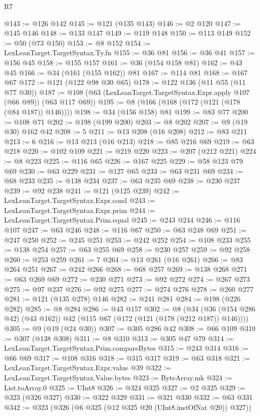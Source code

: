 \begin{lexlean}{R7}
\begin{coremodule}
@143 := @126 @142
@145 := @121 (@135 @143)
@146 := @2 @120
@147 := @145 @146
@148 := @133 @147
@149 := @119 @148
@150 := @113 @149
@152 := @50 (@73 @150)
@153 := @8 @152
@154 := LexLeanTarget.TargetSyntax.Ty.fn
@155 := @36 @81
@156 := @36 @41
@157 := @156 @45
@158 := @155 @157
@161 := @36 (@154 @158 @81)
@162 := @43 @45
@166 := @34 (@161 (@155 @162)) @81
@167 := @114 @81
@168 := @167 @67
@172 := @121 (@122 @98 @30 @65)
@178 := @122 @136 (@11 @55 (@11 @77 @30))
@187 := @108 (@63 (LexLeanTarget.TargetSyntax.Expr.apply @107 (@66 @89)) (@63 @117 @69))
@195 := @8 (@166 (@168 (@172 (@121 (@178 (@84 @187)) @146))))
@198 := @34 (@156 @158) @81
@199 := @83 @77
@200 := @108 @71
@202 := @198 (@199 @200)
@203 := @8 @202
@207 := @9 (@19 @30) @162 @42
@208 := 5
@211 := @13 @208 (@16 @208)
@212 := @83 @211
@213 := 6
@216 := @13 @213 (@16 @213)
@218 := @85 @216 @69
@219 := @63 @218
@220 := @102 @109
@221 := @219 @220
@223 := @207 (@212 @221)
@224 := @8 @223
@225 := @116 @65
@226 := @167 @225
@229 := @58 @123 @79 @69
@230 := @63 @229
@231 := @127 @65
@233 := @63 @231 @69
@234 := @68 @233
@235 := @138 @234
@237 := @63 @235 @69
@238 := @230 @237
@239 := @92 @238
@241 := @121 (@125 @239)
@242 := LexLeanTarget.TargetSyntax.Expr.cond
@243 := LexLeanTarget.TargetSyntax.Expr.prim
@244 := LexLeanTarget.TargetSyntax.Prim.equal
@245 := @243 @244
@246 := @116 @107
@247 := @63 @246
@248 := @116 @67
@250 := @63 @248 @69
@251 := @247 @250
@252 := @245 @251
@253 := @242 @252
@254 := @108 @233
@255 := @138 @254
@257 := @63 @255 @69
@258 := @230 @257
@259 := @92 @258
@260 := @253 @259
@261 := 7
@264 := @13 @261 (@16 @261)
@266 := @83 @264 @251
@267 := @242 @266
@268 := @68 @257
@269 := @138 @268
@271 := @63 @269 @69
@272 := @230 @271
@273 := @92 @272
@274 := @267 @273
@275 := @97 @237
@276 := @92 @275
@277 := @274 @276
@278 := @260 @277
@281 := @121 (@135 @278) @146
@282 := @241 @281
@284 := @198 (@226 @282)
@285 := @8 @284
@286 := @43 @157
@302 := @8
    (@34 (@36 (@154 @286 @42) (@43 @162)) @42 (@115 @67 (@172 (@121 (@178 (@212 @187)) @146))))
@305 := @9 (@19 (@24 @30))
@307 := @305 @286 @42
@308 := @66 @109
@310 := @307 (@138 @308)
@311 := @8 @310
@313 := @305 @47 @79
@314 := LexLeanTarget.TargetSyntax.Prim.compareBytes
@315 := @243 @314
@316 := @66 @69
@317 := @108 @316
@318 := @315 @317
@319 := @63 @318
@321 := LexLeanTarget.TargetSyntax.Expr.value @39
@322 := LexLeanTarget.TargetSyntax.Value.bytes
@323 := ByteArray.mk
@324 := List.toArray.{0}
@325 := UInt8
@326 := @324 @325
@327 := @2 @325
@329 := @323 (@326 @327)
@330 := @322 @329
@331 := @321 @330
@332 := @63 @331
@342 := @323 (@326 (@6 @325 (@12 @325 @20 (UInt8.instOfNat @20)) @327))

\end{coremodule}
\end{lexlean}
